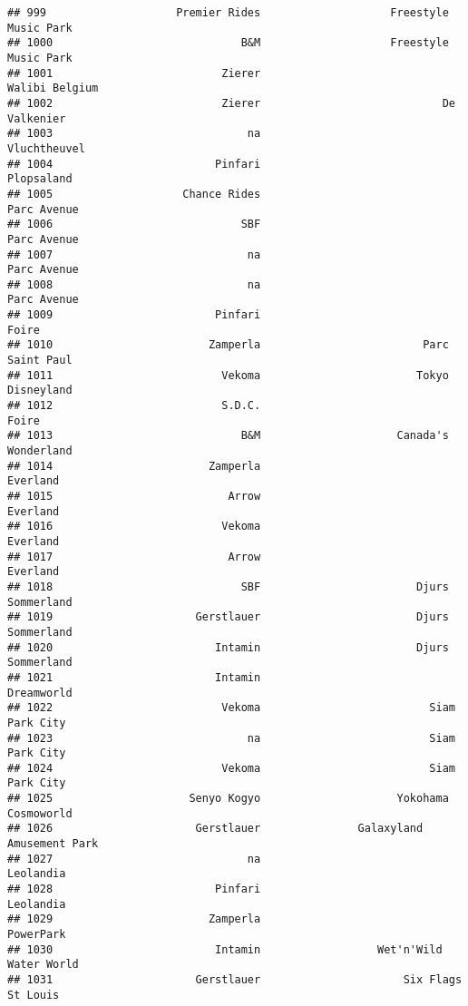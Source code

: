 \documentclass[
]{article}
\begin{document}
\begin{verbatim}
## 999                    Premier Rides                    Freestyle Music Park
## 1000                             B&M                    Freestyle Music Park
## 1001                          Zierer                          Walibi Belgium
## 1002                          Zierer                            De Valkenier
## 1003                              na                            Vluchtheuvel
## 1004                         Pinfari                              Plopsaland
## 1005                    Chance Rides                             Parc Avenue
## 1006                             SBF                             Parc Avenue
## 1007                              na                             Parc Avenue
## 1008                              na                             Parc Avenue
## 1009                         Pinfari                                   Foire
## 1010                        Zamperla                         Parc Saint Paul
## 1011                          Vekoma                        Tokyo Disneyland
## 1012                          S.D.C.                                   Foire
## 1013                             B&M                     Canada's Wonderland
## 1014                        Zamperla                                Everland
## 1015                           Arrow                                Everland
## 1016                          Vekoma                                Everland
## 1017                           Arrow                                Everland
## 1018                             SBF                        Djurs Sommerland
## 1019                      Gerstlauer                        Djurs Sommerland
## 1020                         Intamin                        Djurs Sommerland
## 1021                         Intamin                              Dreamworld
## 1022                          Vekoma                          Siam Park City
## 1023                              na                          Siam Park City
## 1024                          Vekoma                          Siam Park City
## 1025                     Senyo Kogyo                     Yokohama Cosmoworld
## 1026                      Gerstlauer               Galaxyland Amusement Park
## 1027                              na                               Leolandia
## 1028                         Pinfari                               Leolandia
## 1029                        Zamperla                               PowerPark
## 1030                         Intamin                  Wet'n'Wild Water World
## 1031                      Gerstlauer                      Six Flags St Louis

\end{verbatim}
\end{document}
